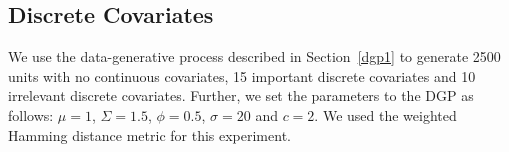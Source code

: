 

\subsection{Discrete Covariates}
We use the data-generative process described in Section~\ref{dgp1} to generate 2500 units with no continuous covariates, 15 important discrete covariates and 10 irrelevant discrete covariates. Further, we set the parameters to the DGP as follows:
$\mu = 1$, $\Sigma = 1.5$, $\phi=0.5$, $\sigma = 20$ and $c = 2$. We used the weighted Hamming distance metric for this experiment.


